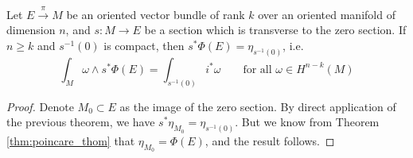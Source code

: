 \begin{cor} \label{cor:vb_localisation} %
	Let $E\xrightarrow{\pi} M$ be an oriented vector bundle of rank $k$ over 
	an oriented manifold of dimension $n$, 
	and $s: M\to E$ be a section which is transverse to the zero section. If 
	$n\geq k$ and $s^{-1}(0)$ is compact, then $s^*\Phi(E)=\eta_{s^{-1}(0)}$, i.e. 
	\[
	\int_M \omega \wedge s^* \Phi(E) =\int_{s^{-1}(0)} i^*\omega  
	\qquad
	\text{for all }\omega\in H^{n-k}(M)
	\] 
\end{cor}
\begin{proof}
	Denote $M_0 \subset E$ as the image of the zero section.
	By direct application of the previous theorem, we have $s^*\eta_{M_0} =
	\eta_{s^{-1}(0)}$. But we know from Theorem \ref{thm:poincare_thom} that 
	$\eta_{M_0} = \Phi(E)$, and the result follows.
\end{proof}

